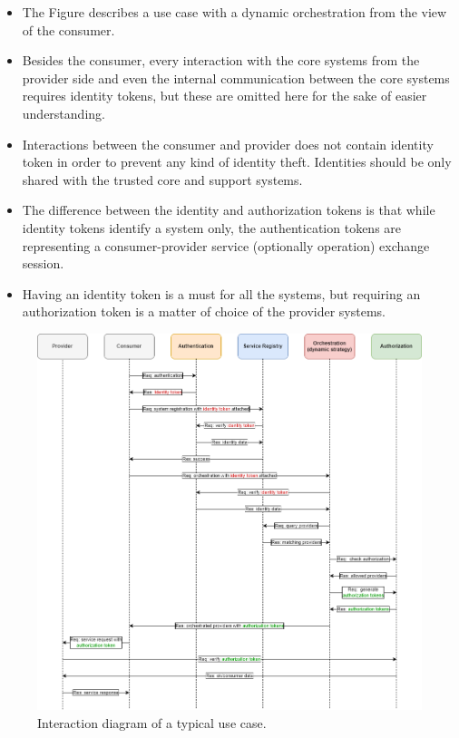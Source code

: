 \documentclass[a4paper]{arrowhead}
\begin{document}
\begin{itemize}
    \item The Figure describes a use case with a dynamic orchestration from the view of the consumer.
    \item Besides the consumer, every interaction with the core systems from the provider side and even the internal communication between the core systems requires identity tokens, but these are omitted here for the sake of easier understanding.
    \item Interactions between the consumer and provider does not contain identity token in order to prevent any kind of identity theft. Identities should be only shared with the trusted core and support systems.
    \item The difference between the identity and authorization tokens is that while identity tokens identify a system only, the authentication tokens are representing a consumer-provider service (optionally operation) exchange session.
    \item Having an identity token is a must for all the systems, but requiring an authorization token is a matter of choice of the provider systems.
\end{itemize}

\begin{figure}[ht!]
  \centering
  \includegraphics[width=\textwidth]{figures/auth_interactions}
  \caption{Interaction diagram of a typical use case. }
  \label{fig:auth_interactions}
\end{figure}
\end{document}
